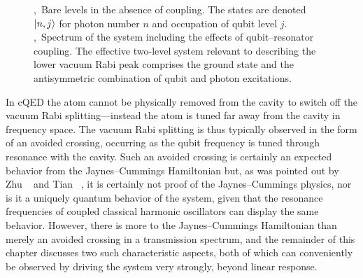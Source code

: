 \begin{figure}
 \centering {}
  \caption[Jaynes--Cummings level diagram of the resonator--qubit system]{ ,~Bare levels in the absence of coupling. The states are denoted $\left\lvert n,j \right\rangle$ for photon number $n$ and occupation of qubit level $j$. ,~Spectrum of the system including the effects of qubit--resonator coupling. The effective two-level system relevant to describing the lower vacuum Rabi peak comprises the ground state and the antisymmetric combination of qubit and photon excitations.\label{fig:figjc}}
\end{figure}%
In cQED the atom cannot be physically removed from the cavity to switch off the vacuum Rabi splitting---instead the atom is tuned far away from the cavity in frequency space. The vacuum Rabi splitting is thus typically observed in the form of an avoided crossing, occurring as the qubit frequency is tuned through resonance with the cavity. Such an avoided crossing is certainly an expected behavior from  the Jaynes--Cummings Hamiltonian but, as was pointed out by Zhu \etal\ \cite{zhu_vacuum_1990} and Tian \etal\ \cite{tian_quantum_1992}, it is certainly not proof of the Jaynes--Cummings physics, nor is it a uniquely quantum behavior of the system, given that the resonance frequencies of coupled classical harmonic oscillators can display the same behavior. However, there is more to the Jaynes--Cummings Hamiltonian than merely an avoided crossing in a transmission spectrum, and the remainder of this chapter discusses two such characteristic aspects, both of which can conveniently be observed by driving the system very strongly, beyond linear response.

